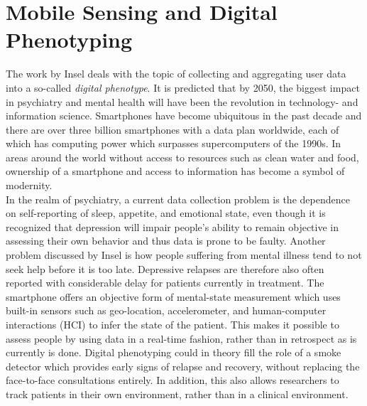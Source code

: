 \section{Mobile Sensing and Digital Phenotyping}
The work by Insel \cite{digital_phenotyping} deals with the topic of collecting and aggregating user data into a so-called \textit{digital phenotype}. It is predicted that by 2050, the biggest impact in psychiatry and mental health will have been the revolution in technology- and information science. Smartphones have become ubiquitous in the past decade and there are over three billion smartphones with a data plan worldwide, each of which has computing power which surpasses supercomputers of the 1990s. In areas around the world without access to resources such as clean water and food, ownership of a smartphone and access to information has become a symbol of modernity. \\

In the realm of psychiatry, a current data collection problem is the dependence on self-reporting of sleep, appetite, and emotional state, even though it is recognized that depression will impair people's ability to remain objective in assessing their own behavior and thus data is prone to be faulty. Another problem discussed by Insel is how people suffering from mental illness tend to not seek help before it is too late. Depressive relapses are therefore also often reported with considerable delay for patients currently in treatment. The smartphone offers an objective form of mental-state measurement which uses built-in sensors such as geo-location, accelerometer, and human-computer interactions (HCI) to infer the state of the patient. This makes it possible to assess people by using data in a real-time fashion, rather than in retrospect as is currently is done. Digital phenotyping could in theory fill the role of a smoke detector which provides early signs of relapse and recovery, without replacing the face-to-face consultations entirely. In addition, this also allows researchers to track patients in their own environment, rather than in a clinical environment. 